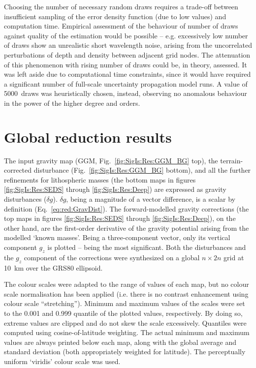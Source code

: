 Choosing the number of necessary random draws requires a trade-off between insufficient sampling of the error density function (due to low values) and computation time.
Empirical assessment of the behaviour of number of draws against quality of the estimation would be possible -- e.g. excessively low number of draws show an unrealistic short wavelength noise, arising from the uncorrelated perturbations of depth and density between adjacent grid nodes.
The attenuation of this phenomenon with rising number of draws could be, in theory, assessed.
It was left aside due to computational time constraints, since it would have required a significant number of full-scale uncertainty propagation model runs.
A value of \num{5000}~draws was heuristically chosen, instead, observing no anomalous behaviour in the power of the higher degree and orders.

\FloatBarrier

\section{Global reduction results}
\label{s:SigIs:Results}




The input gravity map ({GGM}, Fig.~\ref{fig:SigIs:Res:GGM_BG} top), the terrain-corrected disturbance (Fig.~\ref{fig:SigIs:Res:GGM_BG} bottom), and all the further refinements for lithospheric masses (the bottom maps in figures \ref{fig:SigIs:Res:SEDS} through \ref{fig:SigIs:Res:Deep}) are expressed as gravity disturbances ($\delta g$).
$\delta g$, being a magnitude of a vector difference, is a scalar by definition (Eq.~\ref{eq:red:GravDist}).
The forward-modelled gravity corrections (the top maps in figures \ref{fig:SigIs:Res:SEDS} through \ref{fig:SigIs:Res:Deep}), on the other hand, are the first-order derivative of the gravity potential arising from the modelled `known masses'.
Being a three-component vector, only its vertical component $g_z$ is plotted -- being the most significant.
Both the disturbances and the $g_z$ component of the corrections were synthesized on a global $n \times 2n$ grid at \SI{10}{\kilo \metre} over the {GRS80} ellipsoid.

The colour scales were adapted to the range of values of each map, but no colour scale normalisation has been applied (i.e. there is no contrast enhancement using colour scale ``stretching'').
Minimum and maximum values of the scales were set to the \num{0.001} and \num{0.999} quantile of the plotted values, respectively.
By doing so, extreme values are clipped and do not skew the scale excessively.
Quantiles were computed using cosine-of-latitude weighting.
The actual minimum and maximum values are always printed below each map, along with the global average and standard deviation (both appropriately weighted for latitude).
The perceptually uniform `viridis' colour scale \parencite{Smith2015} was used.

